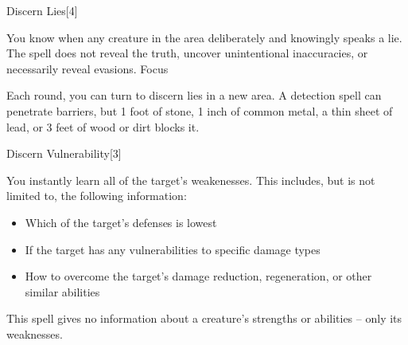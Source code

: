 \begin{spellsection}{Discern Lies}[4]
    \begin{spellheader}
    \end{spellheader}
    \begin{spellcontent}
        \begin{spelltargetinginfo}
        \end{spelltargetinginfo}
        \begin{spelleffects}
            \spelleffect You know when any creature in the area deliberately and knowingly speaks a lie. The spell does not reveal the truth, uncover unintentional inaccuracies, or necessarily reveal evasions.
            \spelldur Focus
        \end{spelleffects}
    \end{spellcontent}
    \begin{spellfooter}
        \spellnotes Each round, you can turn to discern lies in a new area. A detection spell can penetrate barriers, but 1 foot of stone, 1 inch of common metal, a thin sheet of lead, or 3 feet of wood or dirt blocks it.
        \miscastexplode
    \end{spellfooter}
\end{spellsection}

\begin{spellsection}{Discern Vulnerability}[3]
    \begin{spellheader}
    \end{spellheader}
    \begin{spellcontent}
        \begin{spelltargetinginfo}
        \end{spelltargetinginfo}
        \begin{spelleffects}
            \spelleffect You instantly learn all of the target's weakenesses. This includes, but is not limited to, the following information:
            \begin{itemize}
                \item Which of the target's defenses is lowest
                \item If the target has any vulnerabilities to specific damage types
                \item How to overcome the target's damage reduction, regeneration, or other similar abilities
            \end{itemize}
            \spelldur \durshort
        \end{spelleffects}
    \end{spellcontent}
    \begin{spellfooter}
        \spellnotes This spell gives no information about a creature's strengths or abilities -- only its weaknesses.
        \miscastrandom
    \end{spellfooter}
\end{spellsection}

